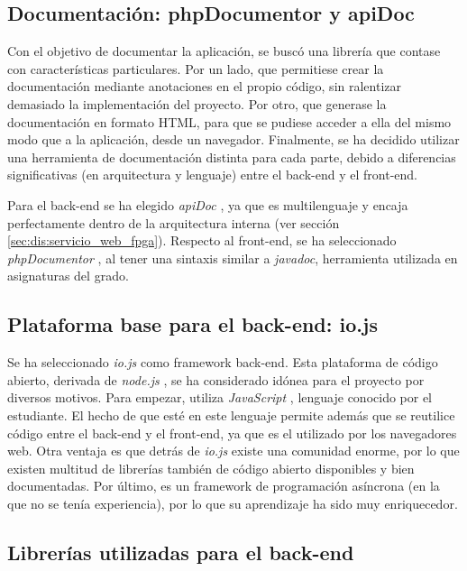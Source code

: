 \subsection*{Documentación: phpDocumentor y apiDoc\label{ssec:dp:docs}}

Con el objetivo de documentar la aplicación, se buscó una librería que contase con características particulares.
Por un lado, que permitiese crear la documentación mediante anotaciones en el propio código, sin ralentizar demasiado la implementación del proyecto.
Por otro, que generase la documentación en formato \gls{HTML}, para que se pudiese acceder a ella del mismo modo que a la aplicación, desde un navegador.
Finalmente, se ha decidido utilizar una herramienta de documentación distinta para cada parte, debido a diferencias significativas (en arquitectura y lenguaje) entre el \gls{back-end} y el \gls{front-end}.

Para el \gls{back-end} se ha elegido \textit{apiDoc} \cite{apidoc}, ya que es multilenguaje y encaja perfectamente dentro de la arquitectura interna (ver sección \ref{sec:dis:servicio_web_fpga}).
Respecto al \gls{front-end}, se ha seleccionado \textit{phpDocumentor} \cite{phpdocumentor}, al tener una sintaxis similar a \textit{javadoc}, herramienta utilizada en asignaturas del grado.

\subsection*{Plataforma base para el \gls{back-end}: io.js\label{ssec:dp:back-end}}

Se ha seleccionado \textit{io.js} \cite{iojs} como \gls{framework} \gls{back-end}.
Esta plataforma de código abierto, derivada de \textit{node.js} \cite{nodejs}, se ha considerado idónea para el proyecto por diversos motivos.
Para empezar, utiliza \textit{JavaScript} \cite{javascript}, lenguaje conocido por el estudiante.
El hecho de que esté en este lenguaje permite además que se reutilice código entre el \gls{back-end} y el \gls{front-end}, ya que es el utilizado por los navegadores web.
Otra ventaja es que detrás de \textit{io.js} existe una comunidad enorme, por lo que existen multitud de librerías también de código abierto disponibles y bien documentadas.
Por último, es un \gls{framework} de programación asíncrona (en la que no se tenía experiencia), por lo que su aprendizaje ha sido muy enriquecedor.

\subsection*{Librerías utilizadas para el \gls{back-end}\label{ssec:dp:back-end-libs}}

